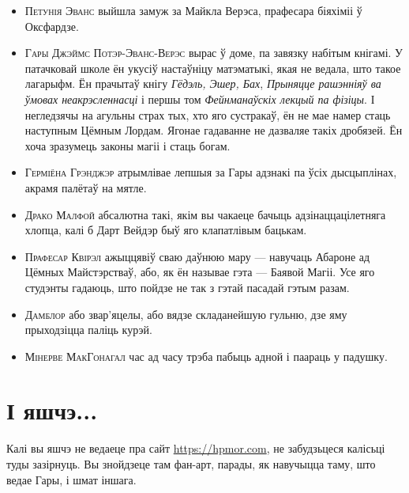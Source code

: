 \begin{itemize}
\item \textsc{Петунія Эванс} 
выйшла замуж за Майкла Верэса, прафесара біяхіміі ў Оксфардзе.
\item \textsc{Гары Джэймс Потэр-Эванс-Верэс}
вырас ў доме, па завязку набітым кнігамі. У патачковай школе ён укусіў настаўніцу матэматыкі,
якая не ведала, што такое лагарыфм. Ён прачытаў кнігу \emph{Гёдэль, Эшер, Бах},
\emph{Прыняцце рашэнніяў ва ўмовах неакрэсленнасці} і першы том 
\emph{Фейнманаўскіх лекцый па фізіцы}. І негледзячы на агульны страх тых, хто 
яго сустракаў, ён не мае намер стаць наступным Цёмным Лордам. 
Ягонае гадаванне не дазваляе такіх дробязей. Ён хоча зразумець законы магіі і стаць
богам. 
\item \textsc{Герміёна Грэнджэр} атрымлівае лепшыя за Гары адзнакі па ўсіх дысцыплінах,
акрамя палётаў на мятле.
\item \textsc{Драко Малфой} абсалютна такі, якім вы чакаеце бачыць адзінаццацілетняга
хлопца, калі б Дарт Вейдэр быў яго клапатлівым бацькам. 
\item \textsc{Прафесар Квірэл} ажыццявіў сваю даўнюю мару --- навучаць 
Абароне ад Цёмных Майстэрстваў, або, як ён называе гэта --- Баявой Магіі. 
Усе яго студэнты гадаюць, што пойдзе не так з гэтай пасадай гэтым разам.
\item \textsc{Дамблор} або звар'яцелы, або вядзе складанейшую гульню, дзе
яму прыходзіцца паліць курэй. 
\item \textsc{Мінерве МакГонагал} час ад часу трэба пабыць адной і паараць у падушку.
\end{itemize}

%
%

\section*{І яшчэ...}
 
Калі вы яшчэ не ведаеце пра сайт \url{https://hpmor.com}, не забудзьцеся 
калісьці туды зазірнуць. Вы знойдзеце там фан-арт, парады, як навучыцца таму, што
ведае Гары, і шмат іншага.



